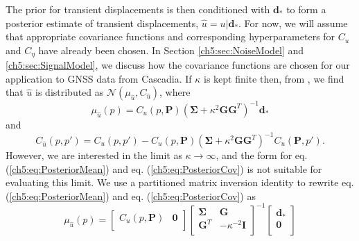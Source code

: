 The prior for transient displacements is then conditioned with
$\mathbf{d}_*$ to form a posterior estimate of transient
displacements, $\hat{u} = u | \mathbf{d}_*$. For now, we will assume
that appropriate covariance functions and corresponding
hyperparameters for $C_u$ and $C_\eta$ have already been chosen. In
Section \ref{ch5:sec:NoiseModel} and \ref{ch5:sec:SignalModel}, we
discuss how the covariance functions are chosen for our application to
GNSS data from Cascadia. If $\kappa$ is kept finite then, from
\citet[sec. 2.2]{Rasmussen2006}, we find that $\hat{u}$ is distributed
as $\mathcal{N}(\mu_{\hat{u}},C_{\hat{u}})$, where
\begin{equation}\label{ch5:eq:PosteriorMean}
\mu_{\hat{u}}(p) = C_u(p,\mathbf{P})\left(\mathbf{\Sigma} + \kappa^2\mathbf{G}\mathbf{G}^T\right)^{-1}\mathbf{d}_*
\end{equation}    
and
\begin{equation}\label{ch5:eq:PosteriorCov}
C_{\hat{u}}(p,p') = C_u(p,p') - C_u(p,\mathbf{P})\left(\mathbf{\Sigma} + \kappa^2\mathbf{G}\mathbf{G}^T\right)^{-1}C_u(\mathbf{P},p').
\end{equation}
However, we are interested in the limit as $\kappa \to \infty$, and
the form for eq. (\ref{ch5:eq:PosteriorMean}) and eq.
(\ref{ch5:eq:PosteriorCov}) is not suitable for evaluating this limit.
We use a partitioned matrix inversion identity \citep[sec.
2.7.4]{Press2007} to rewrite eq. (\ref{ch5:eq:PosteriorMean}) and eq.
(\ref{ch5:eq:PosteriorCov}) as
\begin{equation}\label{ch5:eq:PosteriorMean2}
\mu_{\hat{u}}(p) = \left[\begin{array}{cc}
                         C_u(p,\mathbf{P}) & \mathbf{0} \\
                         \end{array}\right]
                   \left[\begin{array}{cc}
                         \mathbf{\Sigma} & \mathbf{G} \\
                         \mathbf{G}^T  & -\kappa^{-2} \mathbf{I} \\
                         \end{array}\right]^{-1}
                   \left[\begin{array}{c}
                         \mathbf{d}_* \\
                         \mathbf{0} \\
                         \end{array}\right]
\end{equation}    
